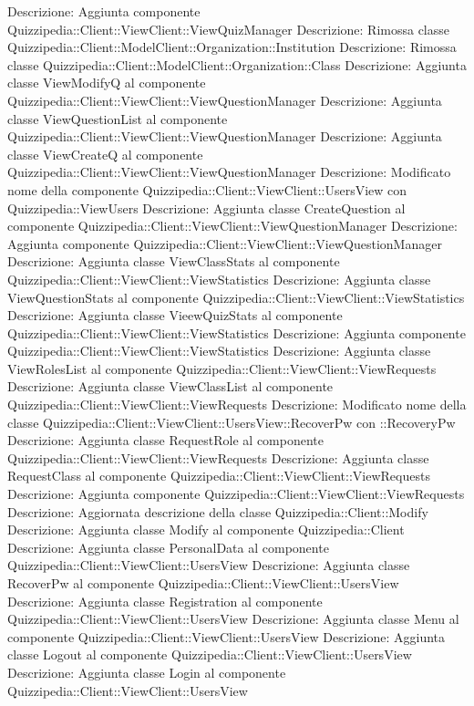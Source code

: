Descrizione: Aggiunta componente Quizzipedia::Client::ViewClient::ViewQuizManager 
Descrizione: Rimossa classe Quizzipedia::Client::ModelClient::Organization::Institution 
Descrizione: Rimossa classe Quizzipedia::Client::ModelClient::Organization::Class 
Descrizione: Aggiunta classe ViewModifyQ al componente Quizzipedia::Client::ViewClient::ViewQuestionManager 
Descrizione: Aggiunta classe ViewQuestionList al componente Quizzipedia::Client::ViewClient::ViewQuestionManager 
Descrizione: Aggiunta classe ViewCreateQ al componente Quizzipedia::Client::ViewClient::ViewQuestionManager 
Descrizione: Modificato nome della componente Quizzipedia::Client::ViewClient::UsersView con Quizzipedia::ViewUsers 
Descrizione: Aggiunta classe CreateQuestion al componente Quizzipedia::Client::ViewClient::ViewQuestionManager 
Descrizione: Aggiunta componente Quizzipedia::Client::ViewClient::ViewQuestionManager 
Descrizione: Aggiunta classe ViewClassStats al componente Quizzipedia::Client::ViewClient::ViewStatistics 
Descrizione: Aggiunta classe ViewQuestionStats al componente Quizzipedia::Client::ViewClient::ViewStatistics 
Descrizione: Aggiunta classe VieewQuizStats al componente Quizzipedia::Client::ViewClient::ViewStatistics 
Descrizione: Aggiunta componente Quizzipedia::Client::ViewClient::ViewStatistics 
Descrizione: Aggiunta classe ViewRolesList al componente Quizzipedia::Client::ViewClient::ViewRequests 
Descrizione: Aggiunta classe ViewClassList al componente Quizzipedia::Client::ViewClient::ViewRequests 
Descrizione: Modificato nome della classe Quizzipedia::Client::ViewClient::UsersView::RecoverPw con ::RecoveryPw 
Descrizione: Aggiunta classe RequestRole al componente Quizzipedia::Client::ViewClient::ViewRequests 
Descrizione: Aggiunta classe RequestClass al componente Quizzipedia::Client::ViewClient::ViewRequests 
Descrizione: Aggiunta componente Quizzipedia::Client::ViewClient::ViewRequests 
Descrizione: Aggiornata descrizione della classe Quizzipedia::Client::Modify 
Descrizione: Aggiunta classe Modify al componente Quizzipedia::Client 
Descrizione: Aggiunta classe PersonalData al componente Quizzipedia::Client::ViewClient::UsersView 
Descrizione: Aggiunta classe RecoverPw al componente Quizzipedia::Client::ViewClient::UsersView 
Descrizione: Aggiunta classe Registration al componente Quizzipedia::Client::ViewClient::UsersView 
Descrizione: Aggiunta classe Menu al componente Quizzipedia::Client::ViewClient::UsersView 
Descrizione: Aggiunta classe Logout al componente Quizzipedia::Client::ViewClient::UsersView 
Descrizione: Aggiunta classe Login al componente Quizzipedia::Client::ViewClient::UsersView 

